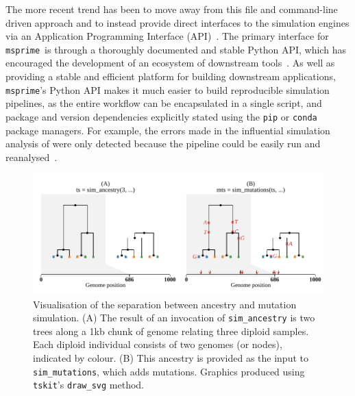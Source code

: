 \documentclass{article}
\newcommand{\msprime}[0]{\texttt{msprime}}
\newcommand{\tskit}[0]{\texttt{tskit}}
\begin{document}
The more recent trend has been to move away from this file and command-line
driven approach and to instead provide direct interfaces to the simulation
engines via an Application Programming Interface (API)~\citep[e.g.][]{
thornton2014cpp,kelleher2016efficient,becheler2019quetzal,haller2019slim}.
The primary interface for \msprime\ is through a thoroughly documented and
stable Python
API, which has encouraged the development of an ecosystem of downstream
tools~\citep{terhorst2017robust,chan2018likelihood,spence2019inference,
adrion2020community,adrion2020predicting, kamm2020efficiently,
mckenzie2020ipcoal, montinaro2020revisiting,
de2021geonomics,rivera2021simulation}.
As well as providing a stable and efficient platform for building
downstream applications, \msprime's Python API makes it much easier to
build reproducible simulation pipelines, as the entire workflow can
be encapsulated in a single script, and package and version
dependencies explicitly stated using the \texttt{pip}
or \texttt{conda} package managers.
For example, the errors made
in the influential simulation analysis of
\cite{martin2017human} were only detected because the pipeline
could be easily run and reanalysed~\citep{ragsdale2020lessons,martin2020erratum}.

\begin{figure}
    \includegraphics{illustrations/mutated_tree}
    \caption{
        \label{fig-mutated-trees}
        Visualisation of the separation between ancestry and mutation
        simulation. (A) The result of an invocation of \texttt{sim\_ancestry}
        is two trees along a 1kb chunk of genome relating three diploid samples.
        Each diploid individual consists of two genomes (or nodes), indicated
        by colour.
        (B) This ancestry is provided as the input to \texttt{sim\_mutations},
        which adds mutations.
        Graphics produced using \tskit's \texttt{draw\_svg} method.
    }
\end{figure}
\end{document}
